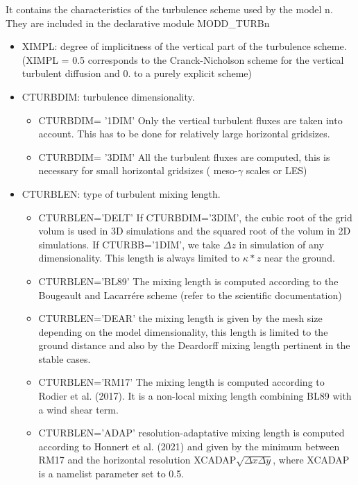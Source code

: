 It contains the characteristics of the turbulence scheme used by the model n. They are
included in the declarative module MODD\_TURBn
\begin{itemize}
\item
{}
XIMPL: degree of implicitness of the vertical part of the turbulence scheme.
(XIMPL = 0.5 corresponds to the Cranck-Nicholson scheme for the vertical
turbulent diffusion and  0. to a purely explicit scheme)
\item
{}
CTURBDIM: turbulence dimensionality. 
\begin{itemize}
\item
CTURBDIM= '1DIM'  Only the vertical turbulent fluxes are taken
into account. This has to be done for relatively large horizontal gridsizes.
\item
CTURBDIM= '3DIM'  All the turbulent fluxes are computed, this is necessary for
small horizontal gridsizes ( meso-$\gamma$ scales or LES)
\end{itemize}

\item
{}
CTURBLEN: type of turbulent mixing length.
\begin{itemize}
\item
CTURBLEN='DELT' If CTURBDIM='3DIM', the cubic root of the grid volum is used
 in 3D simulations and  the squared root of the volum in 2D simulations.
If CTURBB='1DIM', we take 
$\Delta z $ in simulation of any dimensionality. 
This length is always limited to $\kappa * z$  near the ground.
\item
CTURBLEN='BL89'
The mixing length is computed according to the Bougeault and Lacarr\'ere scheme
(refer to the scientific documentation)
\item
CTURBLEN='DEAR'
the mixing length is given by the mesh size depending on the model
dimensionality, this length is limited to the ground distance and
also by the Deardorff mixing length pertinent in the stable cases.
\item
CTURBLEN='RM17'
The mixing length is computed according to Rodier et al. (2017). It is a non-local mixing length combining BL89 with a wind shear term.
\item
CTURBLEN='ADAP'
resolution-adaptative mixing length is computed according to Honnert et al. (2021) and given by the minimum between RM17 and the horizontal resolution XCADAP$\sqrt{\Delta x \Delta y}$, where XCADAP is a namelist parameter set to 0.5.
\end{itemize}


\end{itemize}
